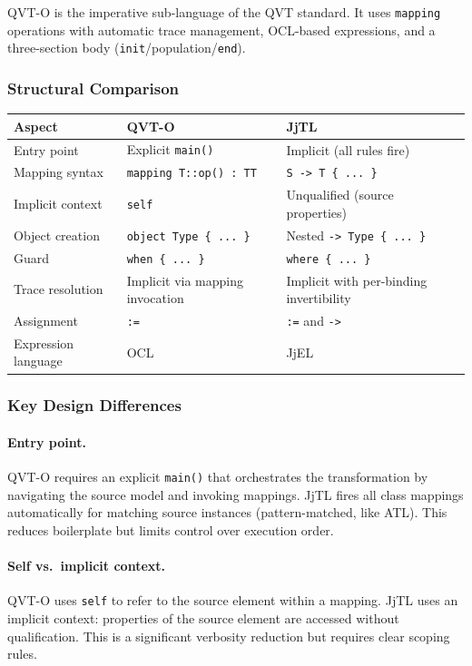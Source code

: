 \documentclass[11pt,a4paper]{article}
\newcommand{\jjel}{\textsf{JjEL}}
\newcommand{\jjtl}{\textsf{JjTL}}
\begin{document}
QVT-O is the imperative sub-language of the QVT standard. It uses \texttt{mapping} operations with automatic trace management, OCL-based expressions, and a three-section body (\texttt{init}/population/\texttt{end}).

\subsubsection{Structural Comparison}

\begin{center}
\begin{tabularx}{\textwidth}{@{}lXX@{}}
\toprule
\textbf{Aspect} & \textbf{QVT-O} & \textbf{JjTL} \\
\midrule
Entry point & Explicit \texttt{main()} & Implicit (all rules fire) \\
Mapping syntax & \texttt{mapping T::op() : TT} & \texttt{S -> T \{ ... \}} \\
Implicit context & \texttt{self} & Unqualified (source properties) \\
Object creation & \texttt{object Type \{ ... \}} & Nested \texttt{-> Type \{ ... \}} \\
Guard & \texttt{when \{ ... \}} & \texttt{where \{ ... \}} \\
Trace resolution & Implicit via mapping invocation & Implicit with per-binding invertibility \\
Assignment & \texttt{:=} & \texttt{:=} and \texttt{->} \\
Expression language & OCL & \jjel{} \\
\bottomrule
\end{tabularx}
\end{center}

\subsubsection{Key Design Differences}

\paragraph{Entry point.} QVT-O requires an explicit \texttt{main()} that orchestrates the transformation by navigating the source model and invoking mappings. \jjtl{} fires all class mappings automatically for matching source instances (pattern-matched, like ATL). This reduces boilerplate but limits control over execution order.

\paragraph{Self vs.\ implicit context.} QVT-O uses \texttt{self} to refer to the source element within a mapping. \jjtl{} uses an implicit context: properties of the source element are accessed without qualification. This is a significant verbosity reduction but requires clear scoping rules.
\end{document}

